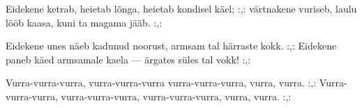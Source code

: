 Eidekene ketrab, heietab l\~onga,
heietab kondisel k\"ael;
:,: v\"artnakene vuriseb, laulu l\"o\"ob kaasa,
kuni ta magama j\"a\"ab. :,: 

Eidekene unes n\"aeb kadunud noorust,
armsam tal h\"arraste kokk.
:,: Eidekene paneb k\"aed armsamale kaela ---
\"argates s\"ules tal vokk! :,: 

Vurra-vurra-vurra, vurra-vurra-vurra
vurra-vurra-vurra, vurra, vurra.
:,: Vurra-vurra-vurra, vurra-vurra-vurra,
vurra-vurra-vurra, vurra, vurra. :,: 